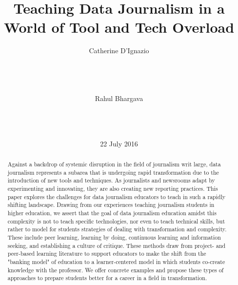 \documentclass{acm_proc_article-sp}
\begin{document}
\title{Teaching Data Journalism in a World of Tool and Tech Overload}

\author{
\alignauthor
Catherine D'Ignazio\\
       \\
       \\
       \\
       \\
\alignauthor
Rahul Bhargava\\
       \\
       \\
       \\
}

\date{22 July 2016}


\makeatletter
\def\@copyrightspace{\relax}
\makeatother

\maketitle
\begin{abstract}
Against a backdrop of systemic disruption in the field of journalism writ large, data journalism represents a subarea that is undergoing rapid transformation due to the introduction of new tools and techniques. As journalists and newsrooms adapt by experimenting and innovating, they are also creating new reporting practices. This paper explores the challenges for data journalism educators to teach in such a rapidly shifting landscape. Drawing from our experiences teaching journalism students in higher education, we assert that the goal of data journalism education amidst this complexity is not to teach specific technologies, nor even to teach technical skills, but rather to model for students strategies of dealing with transformation and complexity. These include peer learning, learning by doing, continuous learning and information seeking, and establishing a culture of critique. These methods draw from project- and peer-based learning literature to support educators to make the shift from the "banking model" of education to a learner-centered model in which students co-create knowledge with the professor. We offer concrete examples and propose these types of approaches to prepare students better for a career in a field in transformation. 

\end{abstract}
\end{document}
